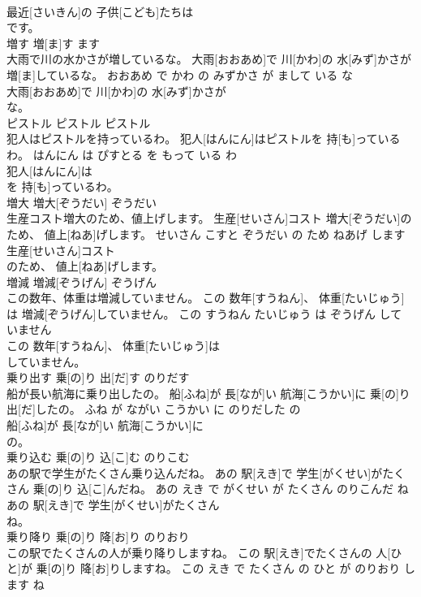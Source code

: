 \documentclass[8pt]{extreport}
\begin{document}
\begin{CJK}{UTF8}{min}
\\	最近[さいきん]の 子供[こども]たちは
\\	です。			
\\	増す	増[ま]す	ます	
\\	大雨で川の水かさが増しているな。	大雨[おおあめ]で 川[かわ]の 水[みず]かさが 増[ま]しているな。	おおあめ で かわ の みずかさ が まして いる な	
\\	大雨[おおあめ]で 川[かわ]の 水[みず]かさが
\\	な。			
\\	ピストル	ピストル	ピストル	
\\	犯人はピストルを持っているわ。	犯人[はんにん]はピストルを 持[も]っているわ。	はんにん は ぴすとる を もって いる わ	
\\	犯人[はんにん]は
\\	を 持[も]っているわ。			
\\	増大	増大[ぞうだい]	ぞうだい	
\\	生産コスト増大のため、値上げします。	生産[せいさん]コスト 増大[ぞうだい]のため、 値上[ねあ]げします。	せいさん こすと ぞうだい の ため ねあげ します	
\\	生産[せいさん]コスト
\\	のため、 値上[ねあ]げします。			
\\	増減	増減[ぞうげん]	ぞうげん	
\\	この数年、体重は増減していません。	この 数年[すうねん]、 体重[たいじゅう]は 増減[ぞうげん]していません。	この すうねん たいじゅう は ぞうげん して いません	
\\	この 数年[すうねん]、 体重[たいじゅう]は
\\	していません。			
\\	乗り出す	乗[の]り 出[だ]す	のりだす	
\\	船が長い航海に乗り出したの。	船[ふね]が 長[なが]い 航海[こうかい]に 乗[の]り 出[だ]したの。	ふね が ながい こうかい に のりだした の	
\\	船[ふね]が 長[なが]い 航海[こうかい]に
\\	の。			
\\	乗り込む	乗[の]り 込[こ]む	のりこむ	
\\	あの駅で学生がたくさん乗り込んだね。	あの 駅[えき]で 学生[がくせい]がたくさん 乗[の]り 込[こ]んだね。	あの えき で がくせい が たくさん のりこんだ ね	
\\	あの 駅[えき]で 学生[がくせい]がたくさん
\\	ね。			
\\	乗り降り	乗[の]り 降[お]り	のりおり	
\\	この駅でたくさんの人が乗り降りしますね。	この 駅[えき]でたくさんの 人[ひと]が 乗[の]り 降[お]りしますね。	この えき で たくさん の ひと が のりおり します ね	

\end{CJK}
\end{document}
